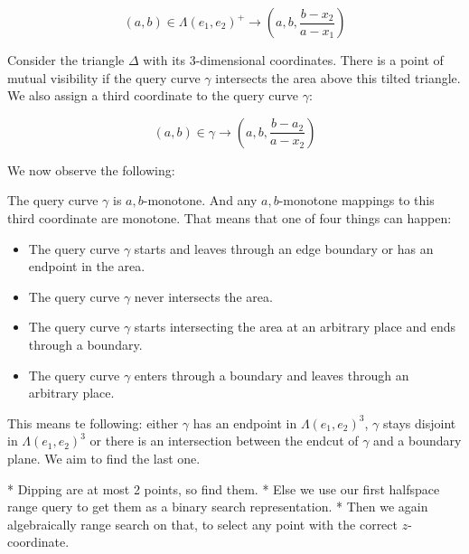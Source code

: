 \begin{equation}
    (a,b) \in \Lambda(e_1, e_2)^+ \rightarrow (a, b,  \frac{b - x_2}{a - x_1})
\end{equation}

Consider the triangle $\Delta$ with its 3-dimensional coordinates. There is a point of mutual visibility if the query curve $\gamma$ intersects the area above this tilted triangle. We also assign a third coordinate to the query curve $\gamma$:

\begin{equation}
    (a,b) \in \gamma \rightarrow (a, b, \frac{b - a_2}{a - x_2})
\end{equation}

We now observe the following:

\begin{observation}
The query curve $\gamma$ is $a,b$-monotone. And any $a,b$-monotone mappings to this third coordinate are monotone. That means that one of four things can happen:
\begin{itemize}
\item The query curve $\gamma$ starts and leaves through an edge boundary or has an endpoint in the area.
\item The query curve $\gamma$ never intersects the area.
\item The query curve $\gamma$ starts intersecting the area at an arbitrary place and ends through a boundary.
\item The query curve $\gamma$ enters through a boundary and leaves through an arbitrary place.
\end{itemize}
\end{observation}

This means te following: either $\gamma$ has an endpoint in $\Lambda(e_1, e_2)^3$, $\gamma$ stays disjoint in $\Lambda(e_1, e_2)^3$ or there is an intersection between the endcut of $\gamma$ and a boundary plane. We aim to find the last one.

* Dipping are at most 2 points, so find them.
* Else we use our first halfspace range query to get them as a binary search representation.
* Then we again algebraically range search on that, to select any point with the correct $z$-coordinate.
